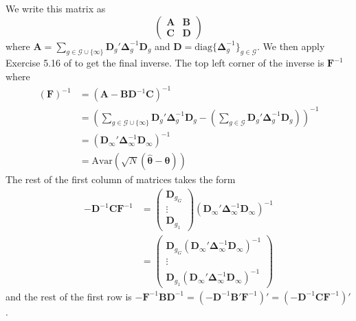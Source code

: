 \documentclass[12pt]{article}
\begin{document}
We write this matrix as 
\begin{equation*}
    \begin{pmatrix}
        \bm A & \bm B\\
        \bm C & \bm D
    \end{pmatrix}
\end{equation*}
where $\bm A = \sum_{g \in \mathcal{G}\cup \{\infty\}} \bm D_g' \bm \Delta_g^{-1} \bm D_g$ and $\bm D = \text{diag} \{ \bm \Delta_g^{-1} \}_{g \in \mathcal{G}}$. We then apply Exercise 5.16 of \citet{abadir2005matrix} to get the final inverse. The top left corner of the inverse is $\bm{F}^{-1}$ where
\begin{align*}
    (\bm{F})^{-1} 
    &= (\bm A - \bm B \bm D^{-1} \bm C)^{-1}\\
    &= \left( \sum_{g \in \mathcal{G}\cup\{\infty\}} \bm D_g' \bm \Delta_g^{-1} \bm D_g - \left( \sum_{g \in \mathcal{G}} \bm D_g' \bm \Delta_g^{-1} \bm D_g \right) \right)^{-1}\\
    &= (\bm D_{\infty}' \bm \Delta_{\infty}^{-1} \bm D_{\infty})^{-1}\\
    &= \text{Avar}(\sqrt{N}(\widehat{\bm{\theta}} - \bm{\theta}))
\end{align*}
The rest of the first column of matrices takes the form
\begin{align*}
    -\bm D^{-1} \bm C \bm{F}^{-1}
    &=
    \begin{pmatrix}
        \bm D_{g_G}\\
        \vdots\\
        \bm D_{g_1}
    \end{pmatrix}
    (\bm D_{\infty}' \bm \Delta_{\infty}^{-1} \bm D_{\infty})^{-1}\\
    &=
    \begin{pmatrix}
        \bm D_{g_G} (\bm D_{\infty}' \bm \Delta_{\infty}^{-1} \bm D_{\infty})^{-1}\\
        \vdots\\
        \bm D_{g_1} (\bm D_{\infty}' \bm \Delta_{\infty}^{-1} \bm D_{\infty})^{-1}
    \end{pmatrix}
\end{align*}
and the rest of the first row is $- \bm{F}^{-1} \bm B \bm D^{-1} = (- \bm D^{-1} \bm B' \bm{F}^{-1})' = (- \bm D^{-1} \bm C \bm{F}^{-1})'$.
\end{document}
